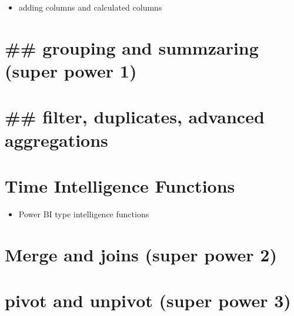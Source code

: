 \documentclass[
  letterpaper,
  DIV=11,
  numbers=noendperiod]{scrreprt}
\providecommand{\tightlist}{%
  \setlength{\itemsep}{0pt}\setlength{\parskip}{0pt}}\usepackage{longtable,booktabs,array}
\begin{document}
\begin{itemize}
\tightlist
\item
  adding columns and calculated columns
\end{itemize}

\section*{\#\# grouping and summzaring (super power
1)}\label{grouping-and-summzaring-super-power-1}


\section*{\#\# filter, duplicates, advanced
aggregations}\label{filter-duplicates-advanced-aggregations}


\section*{Time Intelligence
Functions}\label{time-intelligence-functions}


\begin{itemize}
\tightlist
\item
  Power BI type intelligence functions
\end{itemize}

\section*{Merge and joins (super power
2)}\label{merge-and-joins-super-power-2}


\section*{pivot and unpivot (super power
3)}\label{pivot-and-unpivot-super-power-3}
\end{document}
